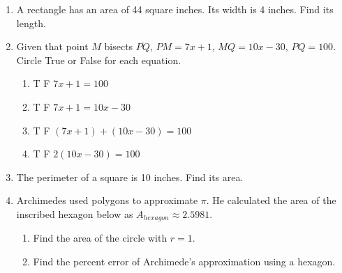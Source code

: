 \begin{enumerate}
\item A rectangle has an area of 44 square inches. Its width is 4 inches. Find its length.
\vspace{3.0cm}

\item Given that point $M$ bisects $\overline{PQ}$, $PM=7x+1$, $MQ=10x-30$, $PQ=100$. Circle True or False for each equation.
  \begin{multicols}{2}
    \begin{enumerate}
      \item T \quad F \quad $7x+1=100$
      \item T \quad F \quad $7x+1=10x-30$
      \item T \quad F \quad $(7x+1) + (10x-30) = 100$
      \item T \quad F \quad $2(10x-30)=100$
    \end{enumerate}
  \end{multicols}

\newpage
\item The perimeter of a square is 10 inches. Find its area. \vspace{2cm}

\item Archimedes used polygons to approximate $\pi$. He calculated the area of the inscribed hexagon below as $A_{hexagon} \approx 2.5981$.
  \begin{multicols}{2}
  \raggedcolumns
  \begin{enumerate}[itemsep=2cm]
    \item Find the area of the circle with $r=1$.
    \item Find the percent error of Archimede's approximation using a hexagon.
  \end{enumerate}
  \begin{flushright}
  \end{flushright}
  \end{multicols}



\end{enumerate}
